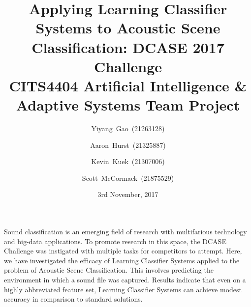 \documentclass[11pt]{article}
\renewenvironment{abstract}
{\small
	\begin{center}
		\bfseries \abstractname\vspace{-.5em}\vspace{0pt}
	\end{center}
	\list{}{
		\setlength{\leftmargin}{.5cm}%
		\setlength{\rightmargin}{\leftmargin}%
	}%
	\item\relax}
{\endlist}
\begin{document}
\title{
	Applying Learning Classifier Systems to Acoustic Scene Classification: DCASE 2017 Challenge \\
	\vspace{0.2in}
	\large CITS4404 Artificial Intelligence \& Adaptive Systems Team Project
}
\author{Yiyang~Gao~(21263128)}
\author{Aaron~Hurst~(21325887)}
\author{Kevin~Kuek~(21307006)}
\author{Scott~McCormack~(21875529)}

\date{3rd November, 2017}

\maketitle

\begin{abstract}
	Sound classification is an emerging field of research with multifarious technology and big-data applications. To promote research in this space, the DCASE Challenge was instigated with multiple tasks for competitors to attempt. Here, we have investigated the efficacy of Learning Classifier Systems applied to the problem of Acoustic Scene Classification. This involves predicting the environment in which a sound file was captured. Results indicate that even on a highly abbreviated feature set, Learning Classifier Systems can achieve modest accuracy in comparison to standard solutions.
\end{abstract}

\end{document}
